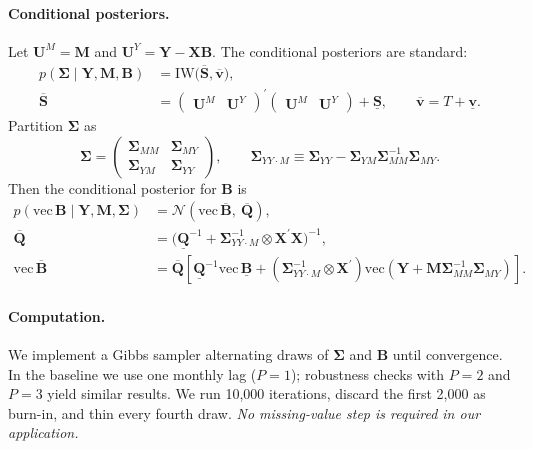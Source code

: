 \documentclass[12pt, reqno]{article}
\begin{document}
\paragraph{Conditional posteriors.}
Let $\boldsymbol{U}^M=\boldsymbol{M}$ and $\boldsymbol{U}^{{Y}}={\boldsymbol{Y}}-\boldsymbol{X}\boldsymbol{B}$. The conditional posteriors are standard:
\begin{align}
p(\boldsymbol{\Sigma}\mid {\boldsymbol{Y}},\boldsymbol{M},\boldsymbol{B})
&=\mathrm{IW}\!\big(\overline{\boldsymbol{S}},\overline{\boldsymbol{v}}\big),\\
\overline{\boldsymbol{S}}
&=\begin{pmatrix}\boldsymbol{U}^{M} & \boldsymbol{U}^{{Y}}\end{pmatrix}^{\!\prime}
\begin{pmatrix}\boldsymbol{U}^{M} & \boldsymbol{U}^{{Y}}\end{pmatrix}
+\underline{\boldsymbol{S}},\qquad
\overline{\boldsymbol{v}}=T+\underline{\boldsymbol{v}}.
\end{align}
Partition $\boldsymbol{\Sigma}$ as
\[
\boldsymbol{\Sigma}=
\begin{pmatrix}
\boldsymbol{\Sigma}_{MM} & \boldsymbol{\Sigma}_{MY}\\
\boldsymbol{\Sigma}_{YM} & \boldsymbol{\Sigma}_{YY}
\end{pmatrix},
\qquad
\boldsymbol{\Sigma}_{YY\cdot M}\equiv \boldsymbol{\Sigma}_{YY}-\boldsymbol{\Sigma}_{YM}\boldsymbol{\Sigma}_{MM}^{-1}\boldsymbol{\Sigma}_{MY}.
\]
Then the conditional posterior for $\boldsymbol{B}$ is
\begin{align}
p\!\left(\mathrm{vec}\,\boldsymbol{B}\mid {\boldsymbol{Y}},\boldsymbol{M},\boldsymbol{\Sigma}\right)
&=\mathcal{N}\!\left(\mathrm{vec}\,\overline{\boldsymbol{B}},\ \overline{\boldsymbol{Q}}\right),\\
\overline{\boldsymbol{Q}}
&=\Big(\underline{\boldsymbol{Q}}^{-1}+\boldsymbol{\Sigma}_{YY\cdot M}^{-1}\otimes \boldsymbol{X}^\prime\boldsymbol{X}\Big)^{-1},\\
\mathrm{vec}\,\overline{\boldsymbol{B}}
&=\overline{\boldsymbol{Q}}\left[\underline{\boldsymbol{Q}}^{-1}\mathrm{vec}\,\underline{\boldsymbol{B}}
+\left(\boldsymbol{\Sigma}_{YY\cdot M}^{-1}\otimes \boldsymbol{X}^\prime\right)
\mathrm{vec}\!\left({\boldsymbol{Y}}+\boldsymbol{M}\boldsymbol{\Sigma}_{MM}^{-1}\boldsymbol{\Sigma}_{MY}\right)\right].
\end{align}

\paragraph{Computation.}
We implement a Gibbs sampler alternating draws of $\boldsymbol{\Sigma}$ and $\boldsymbol{B}$ until convergence. In the baseline we use one monthly lag ($P=1$); robustness checks with $P=2$ and $P=3$ yield similar results. We run 10{,}000 iterations, discard the first 2{,}000 as burn-in, and thin every fourth draw. \emph{No missing-value step is required in our application.}
\end{document}
